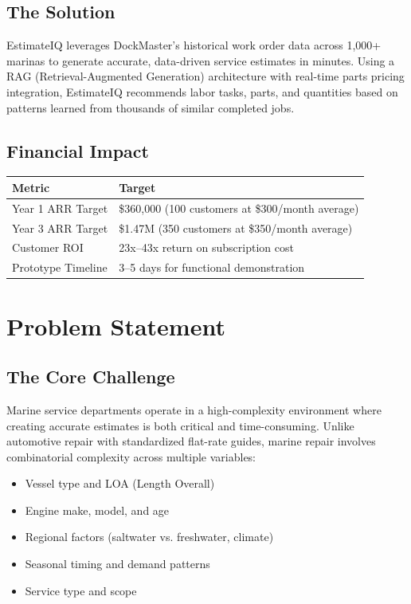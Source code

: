 \documentclass[11pt,a4paper]{article}
\begin{document}
\subsection*{The Solution}
EstimateIQ leverages DockMaster's historical work order data across 1,000+ marinas to generate accurate, data-driven service estimates in minutes. Using a RAG (Retrieval-Augmented Generation) architecture with real-time parts pricing integration, EstimateIQ recommends labor tasks, parts, and quantities based on patterns learned from thousands of similar completed jobs.

\subsection*{Financial Impact}
\begin{table}[H]
\centering
\begin{tabularx}{\textwidth}{@{}L{4cm}X@{}}
\toprule
\textbf{Metric} & \textbf{Target} \\
\midrule
Year 1 ARR Target & \$360,000 (100 customers at \$300/month average) \\
Year 3 ARR Target & \$1.47M (350 customers at \$350/month average) \\
Customer ROI & 23x--43x return on subscription cost \\
Prototype Timeline & 3--5 days for functional demonstration \\
\bottomrule
\end{tabularx}
\end{table}

\newpage
\section{Problem Statement}

\subsection{The Core Challenge}

Marine service departments operate in a high-complexity environment where creating accurate estimates is both critical and time-consuming. Unlike automotive repair with standardized flat-rate guides, marine repair involves combinatorial complexity across multiple variables:

\begin{itemize}[leftmargin=*]
    \item Vessel type and LOA (Length Overall)
    \item Engine make, model, and age
    \item Regional factors (saltwater vs. freshwater, climate)
    \item Seasonal timing and demand patterns
    \item Service type and scope
\end{itemize}
\end{document}
